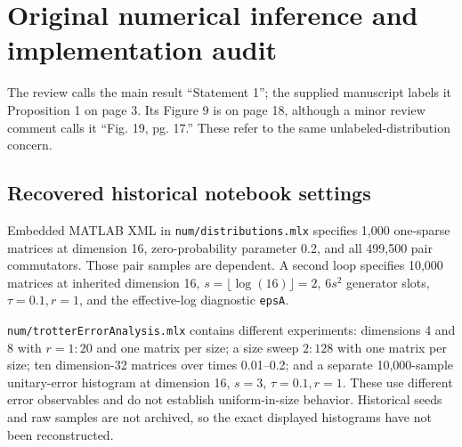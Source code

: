 \documentclass[11pt,a4paper]{article}
\begin{document}
\appendix
\section{Original numerical inference and implementation audit}
The review calls the main result ``Statement 1''; the supplied manuscript labels it Proposition 1 on page 3. Its Figure 9 is on page 18, although a minor review comment calls it ``Fig. 19, pg. 17.'' These refer to the same unlabeled-distribution concern.

\subsection{Recovered historical notebook settings}
Embedded MATLAB XML in \texttt{num/distributions.mlx} specifies 1,000 one-sparse matrices at dimension 16, zero-probability parameter 0.2, and all 499,500 pair commutators. Those pair samples are dependent. A second loop specifies 10,000 matrices at inherited dimension 16, $s=\lfloor\log(16)\rfloor=2$, $6s^2$ generator slots, $\tau=0.1,r=1$, and the effective-log diagnostic \texttt{epsA}.

\texttt{num/trotterErrorAnalysis.mlx} contains different experiments: dimensions 4 and 8 with $r=1{:}20$ and one matrix per size; a size sweep $2{:}128$ with one matrix per size; ten dimension-32 matrices over times 0.01--0.2; and a separate 10,000-sample unitary-error histogram at dimension 16, $s=3$, $\tau=0.1,r=1$. These use different error observables and do not establish uniform-in-size behavior. Historical seeds and raw samples are not archived, so the exact displayed histograms have not been reconstructed.
\end{document}
